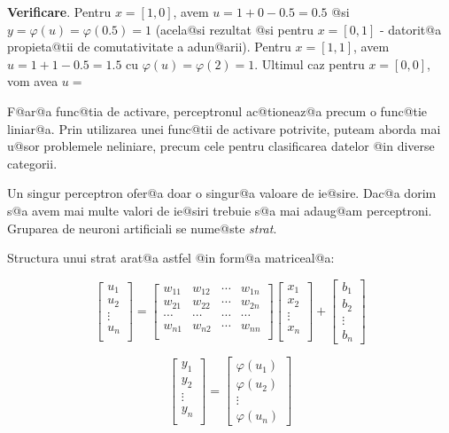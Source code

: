 {\bf Verificare}. Pentru $x = [1, 0]$, avem $u = 1 + 0 - 0.5 = 0.5$ @si $y = \varphi(u) = \varphi(0.5) = 1$ (acela@si rezultat @si pentru $x = [0, 1]$ - datorit@a propieta@tii de comutativitate a adun@arii).
Pentru $x = [1, 1]$, avem $u = 1 + 1 - 0.5 = 1.5$ cu $\varphi (u) = \varphi ( 2 ) = 1$. Ultimul caz pentru $x = [0, 0]$, vom avea $u = $

\begin{observatia}
	F@ar@a func@tia de activare, perceptronul ac@tioneaz@a precum o func@tie liniar@a. Prin utilizarea unei func@tii de activare potrivite, puteam aborda mai u@sor problemele neliniare, precum cele pentru clasificarea datelor @in diverse categorii.
\end{observatia}

Un singur perceptron ofer@a doar o singur@a valoare de ie@sire. Dac@a dorim s@a avem mai multe valori de ie@siri trebuie s@a mai adaug@am perceptroni. Gruparea de neuroni artificiali se nume@ste {\sl strat}.

Structura unui strat arat@a astfel @in form@a matriceal@a:

$$
	\begin{bmatrix}
		u_1 \\
		u_2 \\
		\vdots \\ 
		u_n \\
	\end{bmatrix}	
	= 
	\begin{bmatrix}
		w_{11} & w_{12} & \cdots & w_{1n} \\
		w_{21} & w_{22} & \cdots & w_{2n} \\
		\cdots & \cdots & \cdots & \cdots \\
		w_{n1} & w_{n2} & \cdots & w_{nn} \\
	\end{bmatrix}
	\begin{bmatrix}
		x_1 \\
		x_2 \\
		\vdots \\
		x_n \\
	\end{bmatrix}
	+
	\begin{bmatrix}
		b_1 \\
		b_2 \\
		\vdots \\
		b_n
	\end{bmatrix}
$$

$$
\begin{bmatrix}
		y_1 \\
		y_2 \\
		\vdots \\ 
		y_n \\
	\end{bmatrix}	
	=
	\begin{bmatrix}
		\varphi (u_1)\\
		\varphi	(u_2) \\
		\vdots \\
		\varphi (u_n)
	\end{bmatrix}
$$

